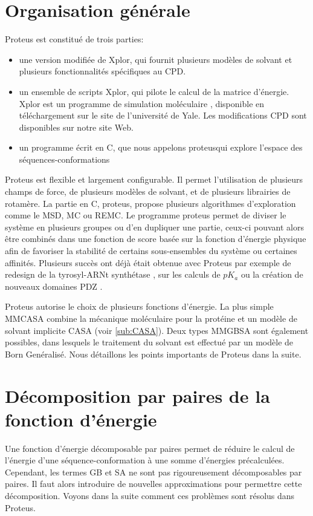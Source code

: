 \section{Organisation générale}

Proteus est constitué de trois parties:
\begin{itemize}
\item une version modifiée de Xplor, qui fournit plusieurs modèles de solvant et plusieurs fonctionnalités spécifiques au CPD.  
\item un ensemble de scripts Xplor, qui pilote le calcul de la matrice d'énergie. Xplor est un programme de simulation moléculaire \cite{Xplor}, disponible en téléchargement sur le site de l'université de Yale. Les modifications CPD sont disponibles sur notre site Web.
\item un programme écrit en C, que nous appelons \og proteus\fg qui explore l'espace des séquences-conformations
\end{itemize}
Proteus est flexible et largement configurable. Il permet l'utilisation de plusieurs champs de force, de plusieurs modèles de solvant, et de plusieurs librairies de rotamère. La partie en C, proteus, propose plusieurs algorithmes d'exploration comme le MSD, MC ou REMC. Le programme proteus permet de diviser le système en plusieurs groupes ou d'en dupliquer une partie, ceux-ci pouvant alors être combinés dans une fonction de score basée sur la fonction d'énergie physique afin de favoriser la stabilité de certains sous-ensembles du système ou certaines affinités. Plusieurs succès ont déjà était obtenue avec Proteus par exemple de redesign de la tyrosyl-ARNt synthétase \cite{Simonson16}, sur les calculs de $pK_a$ \cite{Villa17} ou la création de nouveaux domaines PDZ \cite{Mignon17}.

Proteus autorise le choix de plusieurs fonctions d'énergie. La plus simple \og MMCASA \fg combine la mécanique moléculaire pour la protéine et un modèle de solvant implicite CASA (voir  \vref{sub:CASA}). Deux types \og MMGBSA \fg sont également possibles, dans lesquels le traitement du solvant est effectué par un modèle de Born Genéralisé. Nous détaillons les points importants de Proteus dans la suite.

\section{Décomposition par paires de la fonction d'énergie}
Une fonction d'énergie décomposable par paires permet de réduire le calcul de l'énergie d'une séquence-conformation à une somme d'énergies précalculées. Cependant, les termes GB et SA ne sont pas rigoureusement décomposables par paires. Il faut alors introduire de nouvelles approximations pour permettre cette décomposition. Voyons dans la suite comment ces problèmes sont résolus dans Proteus.

